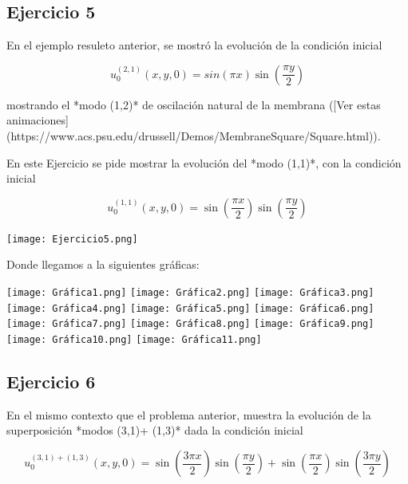 \documentclass[12pt]{article}
\begin{document}


\subsection*{Ejercicio 5}

En el ejemplo resuleto anterior, se mostró la evolución de la condición inicial 

\begin{equation*}
u_0^{(2,1)}(x,y,0) = sin (\pi x) \sin (\frac{\pi y}{2})
\end{equation*}

mostrando el *modo (1,2)* de oscilación natural de la membrana ([Ver estas animaciones](https://www.acs.psu.edu/drussell/Demos/MembraneSquare/Square.html)). 
 
En este Ejercicio se pide mostrar la evolución del *modo (1,1)*, con la condición inicial 

\begin{equation*}
u_0^{(1,1)}(x,y,0) = \sin (\frac{\pi x}{2}) \sin (\frac{\pi y}{2})
\end{equation*}

\begin{center}
    \texttt{[image: Ejercicio5.png]}
    
    Donde llegamos a la siguientes gráficas:
    
    \texttt{[image: Gráfica1.png]}
    \texttt{[image: Gráfica2.png]}
    \texttt{[image: Gráfica3.png]}
    \texttt{[image: Gráfica4.png]}
    \texttt{[image: Gráfica5.png]}
    \texttt{[image: Gráfica6.png]}
    \texttt{[image: Gráfica7.png]}
    \texttt{[image: Gráfica8.png]}
    \texttt{[image: Gráfica9.png]}
    \texttt{[image: Gráfica10.png]}
    \texttt{[image: Gráfica11.png]}
    
\end{center}




\subsection*{Ejercicio 6}

En el mismo contexto que el problema anterior, muestra la evolución de la superposición *modos (3,1)+ (1,3)* dada la condición inicial

\begin{equation*}
u_0^{(3,1)+(1,3)}(x,y,0) = \sin (\frac{3 \pi x}{2}) \sin (\frac{\pi y}{2}) + \sin (\frac{\pi x}{2}) \sin (\frac{3 \pi y}{2})
\end{equation*}
\end{document}
